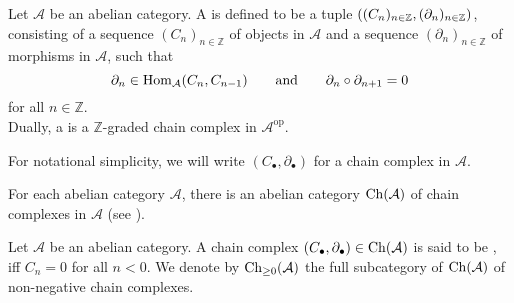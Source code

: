\begin{definition}
	Let $\mathcal{A}$ be an abelian category. A  is defined to be a tuple $\del[0]{(C_n)_{n \in \mathbb{Z}},(\partial_n)_{n \in \mathbb{Z}}}$, consisting of a sequence $(C_n)_{n \in \mathbb{Z}}$ of objects in $\mathcal{A}$ and a sequence $(\partial_n)_{n \in \mathbb{Z}}$ of morphisms in $\mathcal{A}$, such that 
	\begin{equation*}
		\partial_n \in \operatorname{Hom}_\mathcal{A}(C_n,C_{n - 1}) \qquad \text{and} \qquad \partial_n \circ \partial_{n + 1} = 0
	\end{equation*}
	\noindent for all $n \in \mathbb{Z}$.\\
	Dually, a  is a $\mathbb{Z}$-graded chain complex in $\mathcal{A}^\mathrm{op}$. 
\end{definition}

\begin{remark}
	For notational simplicity, we will write $(C_\bullet,\partial_\bullet)$ for a chain complex in $\mathcal{A}$.
\end{remark}

\begin{remark}
	For each abelian category $\mathcal{A}$, there is an abelian category $\operatorname{Ch}(\mathcal{A})$ of chain complexes in $\mathcal{A}$ (see \cite[7]{weibel:homological_algebra:1994}).
\end{remark}

\begin{definition}
	Let $\mathcal{A}$ be an abelian category. A chain complex $(C_\bullet,\partial_\bullet) \in \operatorname{Ch}(\mathcal{A})$ is said to be , iff $C_n = 0$ for all $n < 0$. We denote by $\operatorname{Ch}_{\geq 0}(\mathcal{A})$ the full subcategory of $\operatorname{Ch}(\mathcal{A})$ of non-negative chain complexes.
\end{definition}

